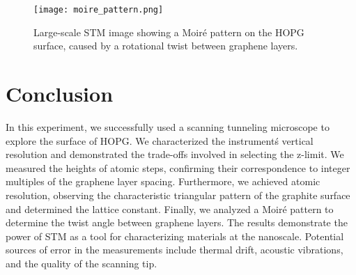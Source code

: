 \documentclass[12pt,a4paper]{article}
\begin{document}
\begin{figure}[H]
    \centering
    \texttt{[image: moire\_pattern.png]}
    \caption{Large-scale STM image showing a Moiré pattern on the HOPG surface, caused by a rotational twist between graphene layers.}
    \label{fig:moire}
\end{figure}


\section{Conclusion}
In this experiment, we successfully used a scanning tunneling microscope to explore the surface of HOPG. We characterized the instrument\'s vertical resolution and demonstrated the trade-offs involved in selecting the z-limit. We measured the heights of atomic steps, confirming their correspondence to integer multiples of the graphene layer spacing. Furthermore, we achieved atomic resolution, observing the characteristic triangular pattern of the graphite surface and determined the lattice constant. %
Finally, we analyzed a Moiré pattern to determine the twist angle between graphene layers. %
The results demonstrate the power of STM as a tool for characterizing materials at the nanoscale. Potential sources of error in the measurements include thermal drift, acoustic vibrations, and the quality of the scanning tip.

\printbibliography
\end{document}
